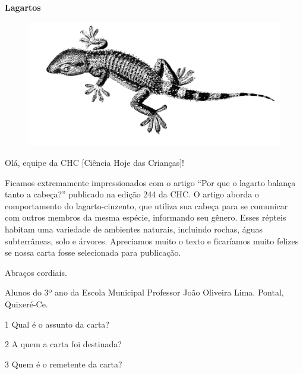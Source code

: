 \begin{myquote}
\textbf{Lagartos}

\begin{figure}
\includegraphics[width=.5\textwidth, angle=-95]{./media/image19d.png}
\end{figure}

Olá, equipe da CHC [Ciência Hoje das Crianças]! 

Ficamos extremamente impressionados com o artigo 
``Por que o lagarto balança tanto a cabeça?'' 
publicado na edição 244 da CHC. O artigo aborda 
o comportamento do lagarto-cinzento, que utiliza 
sua cabeça para se comunicar com outros membros 
da mesma espécie, informando seu gênero. 
Esses répteis habitam uma variedade de ambientes naturais, 
incluindo rochas, águas subterrâneas, solo e árvores. 
Apreciamos muito o texto e ficaríamos muito felizes 
se nossa carta fosse selecionada para publicação. 

Abraços cordiais.

Alunos do 3º ano da Escola Municipal Professor João Oliveira Lima. Pontal, Quixeré-Ce.

\end{myquote}

\num{1} Qual é o assunto da carta?


\num{2} A quem a carta foi destinada?


\num{3} Quem é o remetente da carta?


